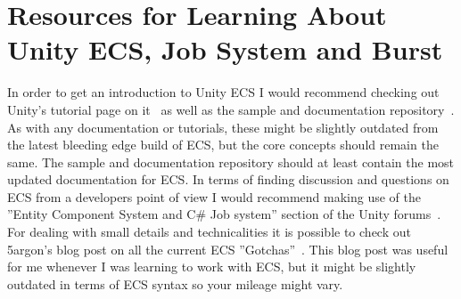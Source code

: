 \section{Resources for Learning About Unity ECS, Job System and Burst}
In order to get an introduction to Unity ECS I would recommend checking out Unity's tutorial page on it~\cite{ecstutorials} as well as the sample and documentation repository~\cite{ecssamples}. As with any documentation or tutorials, these might be slightly outdated from the latest bleeding edge build of ECS, but the core concepts should remain the same. The sample and documentation repository should at least contain the most updated documentation for ECS. In terms of finding discussion and questions on ECS from a developers point of view I would recommend making use of the ''Entity Component System and C\# Job system'' section of the Unity forums~\cite{ecsforums}. For dealing with small details and technicalities it is possible to check out 5argon's blog post on all the current ECS ''Gotchas''~\cite{ecsgotchas}. This blog post was useful for me whenever I was learning to work with ECS, but it might be slightly outdated in terms of ECS syntax so your mileage might vary. 